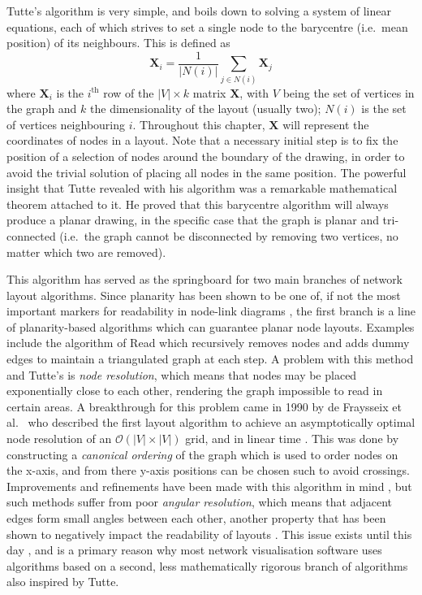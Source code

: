 Tutte's algorithm is very simple, and boils down to solving a system of linear equations, each of which strives to set a single node to the barycentre (i.e.\ mean position) of its neighbours. This is defined as 
\begin{equation}
  \mathbf{X}_i = \frac{1}{|N(i)|}\sum_{j\in N(i)}\mathbf{X}_j
\label{eq:tutte}
\end{equation}
where $\mathbf{X}_i$ is the $i^\text{th}$ row of the $|V|\times k$ matrix $\mathbf{X}$, with $V$ being the set of vertices in the graph and $k$ the dimensionality of the layout (usually two); $N(i)$ is the set of vertices neighbouring $i$.
Throughout this chapter, $\mathbf{X}$ will represent the coordinates of nodes in a layout.
Note that a necessary initial step is to fix the position of a selection of nodes around the boundary of the drawing, in order to avoid the trivial solution of placing all nodes in the same position.
The powerful insight that Tutte revealed with his algorithm was a remarkable mathematical theorem attached to it. He proved that this barycentre algorithm will always produce a planar drawing, in the specific case that the graph is planar and tri-connected (i.e.\ the graph cannot be disconnected by removing two vertices, no matter which two are removed).

This algorithm has served as the springboard for two main branches of network layout algorithms. Since planarity has been shown to be one of, if not the most important markers for readability in node-link diagrams \cite{Purchase1997}, the first branch is a line of planarity-based algorithms which can guarantee planar node layouts. Examples include the algorithm of Read \cite{Read1987} which recursively removes nodes and adds dummy edges to maintain a triangulated graph at each step.  A problem with this method and Tutte's is \emph{node resolution}, which means that nodes may be placed exponentially close to each other, rendering the graph impossible to read in certain areas.
A breakthrough for this problem came in 1990 by de Fraysseix et al.\ \cite{DeFraysseix1990} who described the first layout algorithm to achieve an asymptotically optimal node resolution of an $\mathcal{O}(|V|\times |V|)$ grid, and in linear time \cite{Chrobak1995}. This was done by constructing a \emph{canonical ordering} of the graph \cite{Zhang2005} which is used to order nodes on the x-axis, and from there y-axis positions can be chosen such to avoid crossings.
Improvements and refinements have been made with this algorithm in mind \cite{Zhang2005}, but such methods suffer from poor \emph{angular resolution}, which means that adjacent edges form small angles between each other, another property that has been shown to negatively impact the readability of layouts \cite{Purchase1997}.
This issue exists until this day \cite{Eades2012}, and is a primary reason why most network visualisation software uses algorithms based on a second, less mathematically rigorous branch of algorithms also inspired by Tutte.


